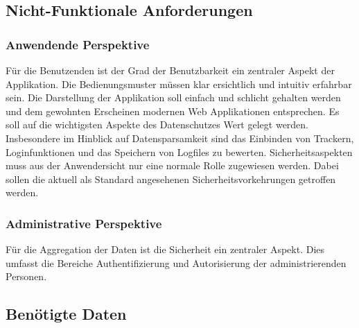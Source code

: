 

\subsection{Nicht-Funktionale Anforderungen}

    \subsubsection{Anwendende Perspektive}
        Für die Benutzenden ist der Grad der Benutzbarkeit ein zentraler Aspekt der Applikation. Die Bedienungsmuster müssen klar ersichtlich und intuitiv erfahrbar sein. Die Darstellung der Applikation soll einfach und schlicht gehalten werden und dem gewohnten Erscheinen modernen Web Applikationen entsprechen.
        Es soll auf die wichtigsten Aspekte des Datenschutzes Wert gelegt werden. Insbesondere im Hinblick auf Datensparsamkeit sind das Einbinden von Trackern, Loginfunktionen und das Speichern von Logfiles zu bewerten.
        Sicherheitsaspekten muss aus der Anwendersicht nur eine normale Rolle zugewiesen werden. Dabei sollen die aktuell als Standard angesehenen Sicherheitsvorkehrungen getroffen werden.

    \subsubsection{Administrative Perspektive}
        Für die Aggregation der Daten ist die Sicherheit ein zentraler Aspekt. Dies umfasst  die Bereiche Authentifizierung und Autorisierung der administrierenden Personen.



\subsection{Benötigte Daten}

